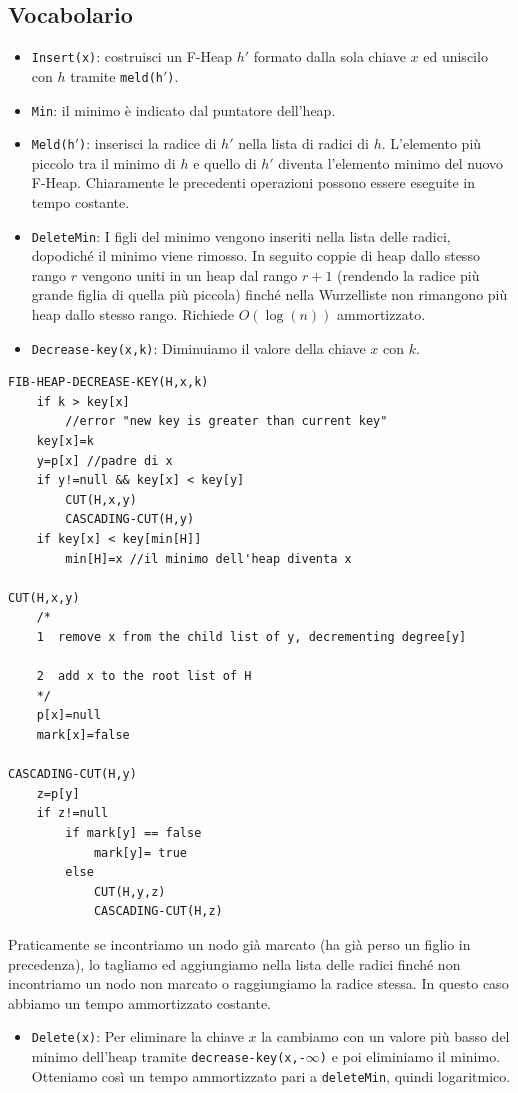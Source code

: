 \documentclass[a4paper]{book}
\newcommand{\inline}[1]{\lstinline!#1!}%
\newcommand{\lstIndent}{4}
\begin{document}
\subsection*{Vocabolario}
\begin{itemize}
\item \inline{Insert(x)}: costruisci un F-Heap $h'$ formato dalla sola chiave $x$ ed uniscilo con $h$ tramite \inline{meld(h}$'$\inline{)}.
\item\inline{Min}: il minimo è indicato dal puntatore dell'heap.
\item\inline{Meld(h}${}'$\inline{)}: inserisci la radice di $h'$ nella lista di radici di $h$. L'elemento più piccolo tra il minimo di $h$ e quello di $h'$ diventa l'elemento minimo del nuovo F-Heap. Chiaramente le precedenti operazioni possono essere eseguite in tempo costante. 
\item \inline{DeleteMin}: I figli del minimo vengono inseriti nella lista delle radici, dopodiché il minimo viene rimosso. In seguito coppie di heap dallo stesso rango $r$ vengono uniti in un heap dal rango $r+1$ (rendendo la radice più grande figlia di quella più piccola) finché nella Wurzelliste non rimangono più heap dallo stesso rango. Richiede $O(\log(n))$ ammortizzato.
\item\inline{Decrease-key(x,k)}: Diminuiamo il valore della chiave $x$ con $k$.
\end{itemize}
\begin{lstlisting}[tabsize=\lstIndent]
FIB-HEAP-DECREASE-KEY(H,x,k) 
	if k > key[x]
		//error "new key is greater than current key"
	key[x]=k
	y=p[x] //padre di x
	if y!=null && key[x] < key[y]
		CUT(H,x,y)
		CASCADING-CUT(H,y)
	if key[x] < key[min[H]]
		min[H]=x //il minimo dell'heap diventa x

CUT(H,x,y)
	/*
	1  remove x from the child list of y, decrementing degree[y]

	2  add x to the root list of H
	*/
	p[x]=null
	mark[x]=false

CASCADING-CUT(H,y)
	z=p[y]
	if z!=null
		if mark[y] == false
			mark[y]= true
		else 
			CUT(H,y,z)
			CASCADING-CUT(H,z)
\end{lstlisting}
Praticamente se incontriamo un nodo già marcato (ha già perso un figlio in precedenza), lo tagliamo ed aggiungiamo nella lista delle radici finché non incontriamo un nodo non marcato o raggiungiamo la radice stessa. In questo caso abbiamo un tempo ammortizzato costante.
\begin{itemize}
\item \inline{Delete(x)}: Per eliminare la chiave $x$ la cambiamo con un valore più basso del minimo dell'heap tramite \inline{decrease-key(x,-}$\infty$\inline{)} e poi eliminiamo il minimo. Otteniamo così un tempo ammortizzato pari a \inline{deleteMin}, quindi logaritmico.
\end{itemize}
\end{document}
